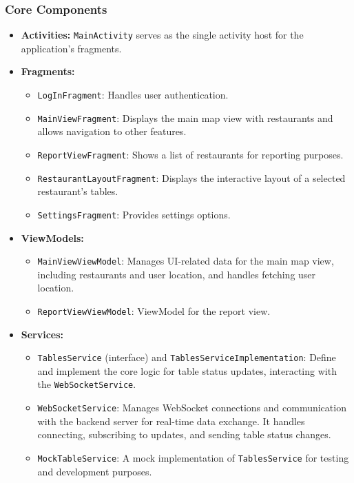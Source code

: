 \documentclass{article}
\begin{document}
\subsubsection{Core Components}
\begin{itemize}
    \item \textbf{Activities:} \texttt{MainActivity} serves as the single activity host for the application's fragments.

    \item \textbf{Fragments:}
    \begin{itemize}[leftmargin=2em]
        \item \texttt{LogInFragment}: Handles user authentication.
        \item \texttt{MainViewFragment}: Displays the main map view with restaurants and allows navigation to other features.
        \item \texttt{ReportViewFragment}: Shows a list of restaurants for reporting purposes.
        \item \texttt{RestaurantLayoutFragment}: Displays the interactive layout of a selected restaurant's tables.
        \item \texttt{SettingsFragment}: Provides settings options.
    \end{itemize}

    \item \textbf{ViewModels:}
    \begin{itemize}[leftmargin=2em]
        \item \texttt{MainViewViewModel}: Manages UI-related data for the main map view, including restaurants and user location, and handles fetching user location.
        \item \texttt{ReportViewViewModel}: ViewModel for the report view.
    \end{itemize}

    \item \textbf{Services:}
    \begin{itemize}[leftmargin=2em]
        \item \texttt{TablesService} (interface) and \texttt{TablesServiceImplementation}: Define and implement the core logic for table status updates, interacting with the \texttt{WebSocketService}.
        \item \texttt{WebSocketService}: Manages WebSocket connections and communication with the backend server for real-time data exchange. It handles connecting, subscribing to updates, and sending table status changes.
        \item \texttt{MockTableService}: A mock implementation of \texttt{TablesService} for testing and development purposes.
    \end{itemize}


\end{itemize}
\end{document}
